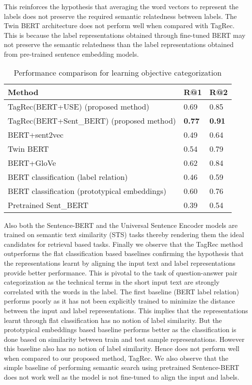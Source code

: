 \documentclass[runningheads, envcountsame, a4paper]{llncs}
\begin{document}
  This reinforces the hypothesis that averaging the word vectors to represent the labels does not preserve the required semantic relatedness between labels. The Twin BERT architecture does not perform well when compared with TagRec. This is because the label representations obtained through fine-tuned BERT may not preserve the semantic relatedness than the label representations obtained from pre-trained sentence embedding models. 

 \begin{table}
 \small
 \centering
\caption{Performance comparison for learning objective categorization}\label{tab1}
\begin{tabular}{p{7.2cm}|p{1cm}|p{1cm}}
 Method & R@1& R@2\\
\hline\hline
 TagRec(BERT+USE) (proposed method) &  0.69 &0.85\\ 
TagRec(BERT+Sent\_BERT) (proposed method) & \bf 0.77 & \bf 0.91 \\ 
BERT+sent2vec & 0.49 &0.64\\ 
Twin BERT \cite{twinbert} & 0.54 &0.79\\ 
BERT+GloVe & 0.62 &0.84\\ 
BERT classification (label relation) \cite{xumulti} \ & 0.46 &0.59\\ 
BERT classification (prototypical embeddings) \cite{snell2017prototypical} & 0.60 &0.76 \\ 
 Pretrained Sent\_BERT  & 0.39 &0.54  \\ 
\hline

\end{tabular}
\end{table}
Also both the Sentence-BERT and the Universal Sentence Encoder models are trained on semantic text similarity (STS) tasks thereby rendering them the ideal candidates for retrieval based tasks. Finally we observe that the TagRec method outperforms the flat classification based baselines confirming the hypothesis that the representations learnt by aligning the input text and label representations provide better performance. This is pivotal to the task of question-answer pair categorization as the technical terms in the short input text are strongly correlated with the words in the label. The first baseline (BERT label relation) performs poorly as it has not been explicitly trained to minimize the distance between the input and label representations. This implies that the representations learnt through flat classification has no notion of label similarity. But the prototypical embeddings based baseline performs better as the classification is done based on similarity between train and test sample representations. However this baseline also has no notion of label similarity. Hence does not perform well when compared to our proposed method, TagRec. We also observe that the simple baseline of performing semantic search using pretrained Sentence-BERT does not work well as the model is not fine-tuned to align the input and labels.
\end{document}
